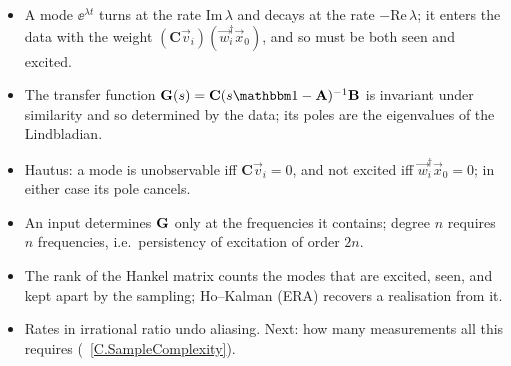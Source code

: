 \documentclass[handoutsbeamer.tex]{subfiles}
\begin{document}
\begin{frame}
\end{frame}

\begin{frame}
\begin{itemize}\setlength\itemsep{0.3em}
    \item A mode $\ee^{\lambda t}$ turns at the rate $\mathrm{Im}\,\lambda$ and decays at the rate $-\mathrm{Re}\,\lambda$; it enters the data with the weight $(\mathbf C\vec v_i)(\vec w_i^\dagger\vec x_0)$, and so must be both seen and excited.
    \item The transfer function $\TF(s)=\mathbf C(s\Id-\mathbf A)^{-1}\mathbf B$ is invariant under similarity and so determined by the data; its poles are the eigenvalues of the Lindbladian.
    \item Hautus: a mode is unobservable iff $\mathbf C\vec v_i=0$, and not excited iff $\vec w_i^\dagger\vec x_0=0$; in either case its pole cancels.
    \item An input determines $\mathbf{G}$ only at the frequencies it contains; degree $n$ requires $n$ frequencies, i.e.\ persistency of excitation of order $2n$.
    \item The rank of the Hankel matrix counts the modes that are excited, seen, and kept apart by the sampling; Ho--Kalman (ERA) recovers a realisation from it.
    \item Rates in irrational ratio undo aliasing. Next: how many measurements all this requires (\Chap~\ref{C.SampleComplexity}).
\end{itemize}
\end{frame}
\end{document}
